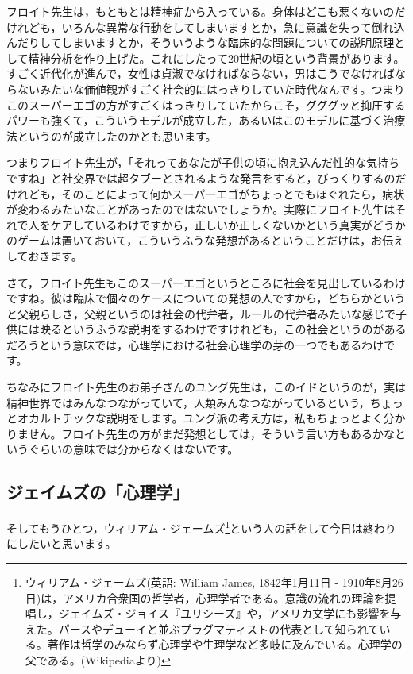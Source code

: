 \documentclass{ltjsbook}
\begin{document}
フロイト先生は，もともとは精神症から入っている。身体はどこも悪くないのだけれども，いろんな異常な行動をしてしまいますとか，急に意識を失って倒れ込んだりしてしまいますとか，そういうような臨床的な問題についての説明原理として精神分析を作り上げた。これにしたって20世紀の頃という背景があります。すごく近代化が進んで，女性は貞淑でなければならない，男はこうでなければならないみたいな価値観がすごく社会的にはっきりしていた時代なんです。つまりこのスーパーエゴの方がすごくはっきりしていたからこそ，グググッと抑圧するパワーも強くて，こういうモデルが成立した，あるいはこのモデルに基づく治療法というのが成立したのかとも思います。

つまりフロイト先生が，「それってあなたが子供の頃に抱え込んだ性的な気持ちですね」と社交界では超タブーとされるような発言をすると，びっくりするのだけれども，そのことによって何かスーパーエゴがちょっとでもほぐれたら，病状が変わるみたいなことがあったのではないでしょうか。実際にフロイト先生はそれで人をケアしているわけですから，正しいか正しくないかという真実がどうかのゲームは置いておいて，こういうふうな発想があるということだけは，お伝えしておきます。

さて，フロイト先生もこのスーパーエゴというところに社会を見出しているわけですね。彼は臨床で個々のケースについての発想の人ですから，どちらかというと父親らしさ，父親というのは社会の代弁者，ルールの代弁者みたいな感じで子供には映るというふうな説明をするわけですけれども，この社会というのがあるだろうという意味では，心理学における社会心理学の芽の一つでもあるわけです。

ちなみにフロイト先生のお弟子さんのユング先生は，このイドというのが，実は精神世界ではみんなつながっていて，人類みんなつながっているという，ちょっとオカルトチックな説明をします。ユング派の考え方は，私もちょっとよく分かりません。フロイト先生の方がまだ発想としては，そういう言い方もあるかなというぐらいの意味では分からなくはないです。

\subsection{ジェイムズの「心理学」}

そしてもうひとつ，ウィリアム・ジェームズ\footnote{ウィリアム・ジェームズ(英語: William James, 1842年1月11日 - 1910年8月26日)は，アメリカ合衆国の哲学者，心理学者である。意識の流れの理論を提唱し，ジェイムズ・ジョイス『ユリシーズ』や，アメリカ文学にも影響を与えた。パースやデューイと並ぶプラグマティストの代表として知られている。著作は哲学のみならず心理学や生理学など多岐に及んでいる。心理学の父である。(Wikipediaより)}という人の話をして今日は終わりにしたいと思います。
\end{document}
